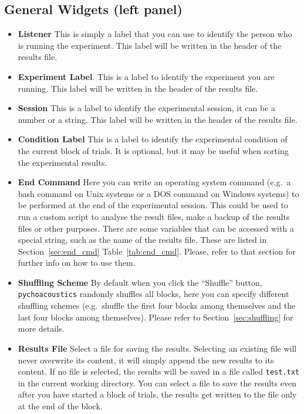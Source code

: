 \subsection{General Widgets (left panel)}
\label{sec:gui_left_panel}
\begin{itemize}
\item \textbf{Listener} This is simply a label that you can use to identify
the person who is running the experiment. This label will be written in the 
header of the results file.
\item \textbf{Experiment Label}. This is a label to identify the experiment 
you are running. This label will be written in the 
header of the results file.
\item \textbf{Session} This is a label to identify the experimental session,
it can be a number or a string. This label will be written in the 
header of the results file.
\item \textbf{Condition Label} This is a label to identify the experimental
condition of the current block of trials. It is optional, but it may be useful when
sorting the experimental results.
\item \textbf{End Command} Here you can write an operating system command 
(e.g.\ a bash command on Unix systems or a DOS command on Windows systems) to 
be performed at the end of the experimental session. 
This could be used to run a custom script to analyse the result files,
make a backup of the results files or other purposes. There are some variables
that can be accessed with a special string, such as the name of the results
file. These are listed in Section~\ref{sec:end_cmd} Table~\ref{tab:end_cmd}. Please, refer to that section 
for further info on how to use them. 

\item \textbf{Shuffling Scheme} By default when you click the ``Shuffle'' button, \texttt{pychoacoustics} randomly shuffles all blocks, here you can specify
different shuffling schemes (e.g.\ shuffle the first four blocks among themselves and the last four blocks among themselves).
Please refer to Section~\ref{sec:shuffling} for more details.

\item \textbf{Results File} Select a file for saving the results. Selecting an existing file will never
overwrite its content, it will simply append the new results to its content. If no file is selected,
the results will be saved in a file called \texttt{test.txt} in the current working directory. You can select
a file to save the results even after you have started a block of trials, the results get written to
the file only at the end of the block.


\end{itemize}
